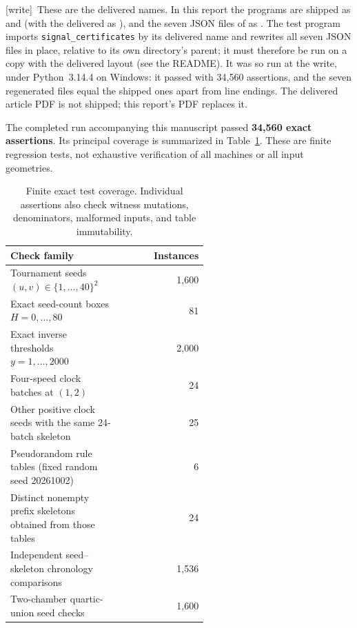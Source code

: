 \documentclass[11pt,letterpaper]{article}
\numberwithin{equation}{section}
\theoremstyle{definition}
\theoremstyle{remark}
\newcommand{\wtag}{\textup{[write]}}
\begin{document}
\wtag\ These are the delivered names. In this report the programs are shipped as  and  (with the delivered  as ), and the seven JSON files of  as . The test program imports \texttt{signal\_certificates} by its delivered name and rewrites all seven JSON files in place, relative to its own directory's parent; it must therefore be run on a copy with the delivered layout (see the README). It was so run at the write, under Python~3.14.4 on Windows: it passed with 34,560 assertions, and the seven regenerated files equal the shipped ones apart from line endings. The delivered article PDF is not shipped; this report's PDF replaces it.

The completed run accompanying this manuscript passed \textbf{34,560 exact
assertions}. Its principal coverage is summarized in
Table~\ref{smc:cg:tab:tests}. These are finite regression tests, not exhaustive
verification of all machines or all input geometries.

\begin{table}[htbp]
\centering
\small
\begin{tabular}{p{0.57\linewidth}r}
\toprule
Check family & Instances\\
\midrule
Tournament seeds $(u,v)\in\{1,\ldots,40\}^2$ & 1,600\\
Exact seed-count boxes $H=0,\ldots,80$ & 81\\
Exact inverse thresholds $y=1,\ldots,2000$ & 2,000\\
Four-speed clock batches at $(1,2)$ & 24\\
Other positive clock seeds with the same 24-batch skeleton & 25\\
Pseudorandom rule tables (fixed random seed 20261002) & 6\\
Distinct nonempty prefix skeletons obtained from those tables & 24\\
Independent seed--skeleton chronology comparisons & 1,536\\
Two-chamber quartic-union seed checks & 1,600\\
\bottomrule
\end{tabular}
\caption{Finite exact test coverage. Individual assertions also check
witness mutations, denominators, malformed inputs, and table immutability.}
\label{smc:cg:tab:tests}
\end{table}
\end{document}
